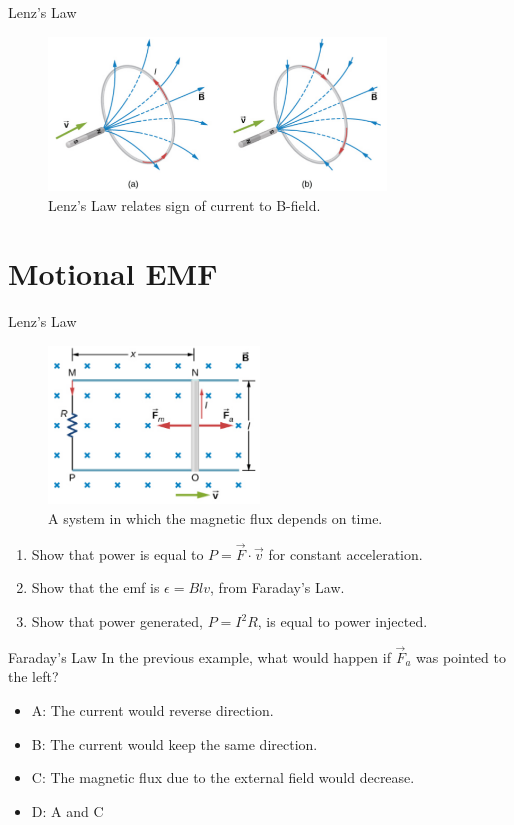 \documentclass{beamer}
\begin{document}
\begin{frame}{Lenz's Law}
\begin{figure}
\centering
\includegraphics[width=0.8\textwidth]{figures/lenz.png}
\caption{\label{fig:loop3} Lenz's Law relates sign of current to B-field.}
\end{figure}
\end{frame}

\section{Motional EMF}

\begin{frame}{Lenz's Law}
\small
\begin{figure}
\centering
\includegraphics[width=0.5\textwidth]{figures/loop2.png}
\caption{\label{fig:loop4} A system in which the magnetic flux depends on time.}
\end{figure}
\begin{enumerate}
\item Show that power is equal to $P = \vec{F} \cdot \vec{v}$ for constant acceleration.
\item Show that the emf is $\epsilon = B l v$, from Faraday's Law.
\item Show that power generated, $P = I^2 R$, is equal to power injected.
\end{enumerate}
\end{frame}

\begin{frame}{Faraday's Law}
In the previous example, what would happen if $\vec{F}_a$ was pointed to the left?
\begin{itemize}
\item A: The current would reverse direction.
\item B: The current would keep the same direction.
\item C: The magnetic flux due to the external field would decrease.
\item D: A and C
\end{itemize}
\end{frame}
\end{document}
